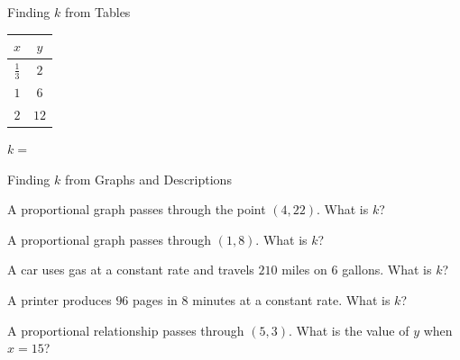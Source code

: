 \begin{practiceBox}{Finding $k$ from Tables}
\prob \begin{center}
\begin{tabular}{|c|c|}
\hline $x$ & $y$ \\ \hline
$\frac{1}{3}$ & $2$ \\ $1$ & $6$ \\ $2$ & $12$ \\ \hline
\end{tabular}
\end{center}
$k = $ \answerBlank[3cm]

\end{practiceBox}

\begin{practiceBox}[funTeal]{Finding $k$ from Graphs and Descriptions}

\prob A proportional graph passes through the point $(4, 22)$. What is $k$?
\answerBlank[3cm]

\prob A proportional graph passes through $(1, 8)$. What is $k$?
\answerBlank[3cm]

\prob A car uses gas at a constant rate and travels $210$ miles on $6$ gallons. What is $k$?
\answerBlank[3cm]

\prob A printer produces $96$ pages in $8$ minutes at a constant rate. What is $k$?
\answerBlank[3cm]

\prob A proportional relationship passes through $(5, 3)$. What is the value of $y$ when $x = 15$?
\answerBlank[3cm]

\end{practiceBox}

